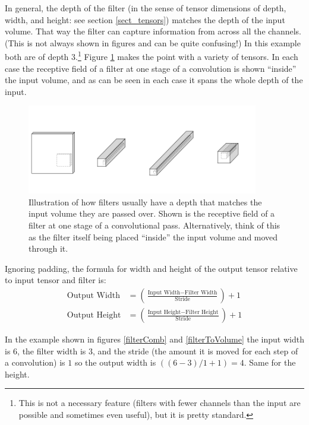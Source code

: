 In general, the depth of the filter (in the sense of tensor dimensions of depth, width, and height: see section \ref{sect_tensors}) matches the depth of the input volume. That way the filter can capture information from across all the channels. (This is not always shown in figures and can be quite confusing!)  In this example both are of depth 3.\footnote{This is not a necessary feature (filters with fewer channels than the input are possible and sometimes even useful), but it is pretty standard.} Figure \ref{filterDepth} makes the point with a variety of tensors. In each case the receptive field of a filter at one stage of a convolution is shown ``inside'' the input volume, and as can be seen in each case it spans the whole depth of the input. 

\begin{figure}
\centering
\includegraphics[width=0.9\textwidth]{images/filterDepth}
\caption[Soraya Boza.]{Illustration of how filters usually have a depth that matches the input volume they are passed over. Shown is the receptive field of a filter at one stage of a convolutional pass. Alternatively, think of this as the filter itself being placed ``inside'' the input volume and moved through it.}
\label{filterDepth}
\end{figure}

Ignoring padding, the formula for width and height of the output tensor relative to input tensor and filter is:
\begin{align*}
\text{Output Width} &= \left( \frac{\text{Input Width} - \text{Filter Width}}{\text{Stride}} \right) + 1 \\
\text{Output Height} &= \left(  \frac{\text{Input Height} - \text{Filter Height}}{\text{Stride}} \right) + 1
\end{align*}

In the example shown in figures \ref{filterComb} and \ref{filterToVolume} the input width is $6$, the filter width is $3$, and the stride (the amount it is moved for each step of a convolution) is $1$ so the output width is $((6-3)/1 + 1) = 4$. Same for the height. 


